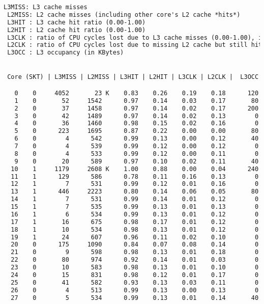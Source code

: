 \begin{lstlisting}[language=TeX]
 L3MISS: L3 cache misses
 L2MISS: L2 cache misses (including other core's L2 cache *hits*)
 L3HIT : L3 cache hit ratio (0.00-1.00)
 L2HIT : L2 cache hit ratio (0.00-1.00)
 L3CLK : ratio of CPU cycles lost due to L3 cache misses (0.00-1.00), in some cases could be >1.0 due to a higher memory latency
 L2CLK : ratio of CPU cycles lost due to missing L2 cache but still hitting  L3 cache (0.00-1.00)
 L3OCC : L3 occupancy (in KBytes)


 Core (SKT) | L3MISS | L2MISS | L3HIT | L2HIT | L3CLK | L2CLK |  L3OCC

   0    0     4052       23 K    0.83    0.26    0.19    0.18      120
   1    0       52     1542      0.97    0.14    0.03    0.17       80
   2    0       37     1458      0.97    0.14    0.02    0.17      200
   3    0       42     1489      0.97    0.14    0.02    0.13        0
   4    0       36     1460      0.98    0.15    0.02    0.16        0
   5    0      223     1695      0.87    0.22    0.00    0.00       80
   6    0        4      542      0.99    0.13    0.00    0.12       40
   7    0        4      539      0.99    0.12    0.00    0.12        0
   8    0        4      533      0.99    0.12    0.00    0.11        0
   9    0       20      589      0.97    0.10    0.02    0.11       40
  10    1     1179     2608 K    1.00    0.88    0.00    0.04      240
  11    1      129      586      0.78    0.11    0.16    0.13        0
  12    1        7      531      0.99    0.12    0.01    0.16        0
  13    1      446     2223      0.80    0.14    0.06    0.05       80
  14    1        7      531      0.99    0.14    0.01    0.12        0
  15    1        7      535      0.99    0.13    0.01    0.13        0
  16    1        6      534      0.99    0.13    0.01    0.12        0
  17    1       16      675      0.98    0.17    0.01    0.12        0
  18    1       10      534      0.98    0.13    0.01    0.12        0
  19    1       24      607      0.96    0.11    0.02    0.10        0
  20    0      175     1090      0.84    0.07    0.08    0.14        0
  21    0        9      598      0.98    0.13    0.01    0.18        0
  22    0       80      974      0.92    0.14    0.01    0.03        0
  23    0       10      583      0.98    0.13    0.01    0.10        0
  24    0       15      831      0.98    0.12    0.01    0.17        0
  25    0       41      582      0.93    0.13    0.03    0.11        0
  26    0        4      513      0.99    0.13    0.00    0.13        0
  27    0        5      534      0.99    0.13    0.01    0.14       40

\end{lstlisting}
